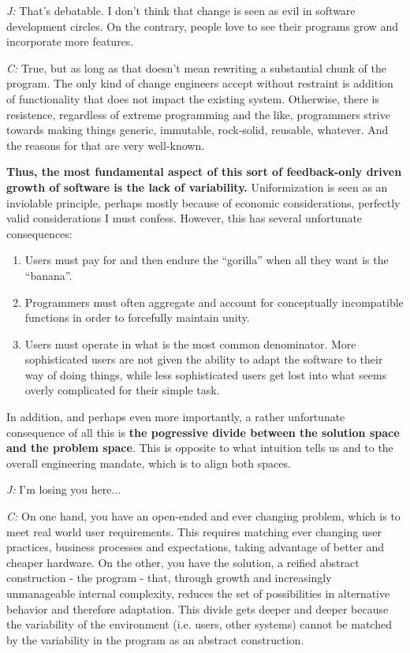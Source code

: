 \documentclass[10pt]{sigplanconf}
\begin{document}
\emph{J:} That's debatable. I don't think that change is seen as evil in software development circles. On the contrary, people love to see their programs grow and incorporate more features.

\emph{C:} True, but as long as that doesn't mean rewriting a substantial chunk of the program. The only kind of change engineers accept without restraint is addition of functionality that does not impact the existing system. Otherwise, there is resistence, regardless of extreme programming and the like, programmers strive towards making things generic, immutable, rock-solid, reusable, whatever. And the reasons for that are very well-known.

\textbf{Thus, the most fundamental aspect of this sort of feedback-only driven growth of software is the lack of variability.} Uniformization is seen as an inviolable principle, perhaps mostly because of economic considerations, perfectly valid considerations I must confess. However, this has several unfortunate consequences:

\begin{enumerate}
\item Users must pay for and then endure the ``gorilla'' when all they want is the ``banana''.
\item Programmers must often aggregate and account for conceptually incompatible functions in order to forcefully maintain unity.
\item Users must operate in what is the most common denominator. More sophisticated users are not given the ability to adapt the software to their way of doing things, while less sophisticated users get lost into what seems overly complicated for their simple task.
\end{enumerate}

In addition, and perhaps even more importantly, a rather unfortunate consequence of all this is \textbf{the pogressive divide between the solution space and the problem space}. This is opposite to what intuition tells us and to the overall engineering mandate, which is to align both spaces.

\emph{J:} I'm losing you here...

\emph{C:} On one hand, you have an open-ended and ever changing problem, which is to meet real world user requirements. This requires matching ever changing user practices, business processes and expectations, taking advantage of better and cheaper hardware. On the other, you have the solution, a reified abstract construction - the program - that, through growth and increasingly unmanageable internal complexity, reduces the set of possibilities in alternative behavior and therefore adaptation. This divide gets deeper and deeper because the variability of the environment (i.e. users, other systems) cannot be matched by the variability in the program as an abstract construction.
\end{document}
